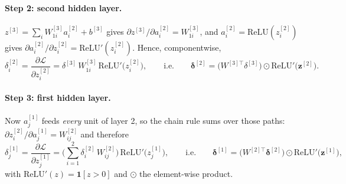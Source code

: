 \documentclass[11pt,a4paper]{article}
\begin{document}
\paragraph{Step 2: second hidden layer.} $z^{[3]}=\sum_{i}W^{[3]}_{1i}a^{[2]}_i+b^{[3]}$
gives $\partial z^{[3]}/\partial a^{[2]}_i=W^{[3]}_{1i}$, and $a^{[2]}_i=\mathrm{ReLU}(z^{[2]}_i)$
gives $\partial a^{[2]}_i/\partial z^{[2]}_i=\mathrm{ReLU}'(z^{[2]}_i)$. Hence, componentwise,
\begin{equation}
\delta^{[2]}_i=\frac{\partial\mathcal{L}}{\partial z^{[2]}_i}
=\delta^{[3]}\,W^{[3]}_{1i}\,\mathrm{ReLU}'\!\big(z^{[2]}_i\big),
\qquad\text{i.e.}\qquad
\boldsymbol{\delta}^{[2]} = \big(W^{[3]\top}\delta^{[3]}\big)\odot
      \mathrm{ReLU}'\!\big(\mathbf{z}^{[2]}\big).
\end{equation}

\paragraph{Step 3: first hidden layer.} Now $a^{[1]}_j$ feeds \emph{every} unit of layer 2,
so the chain rule sums over those paths: $\partial z^{[2]}_i/\partial a^{[1]}_j=W^{[2]}_{ij}$
and therefore
\begin{equation}
\delta^{[1]}_j=\frac{\partial\mathcal{L}}{\partial z^{[1]}_j}
=\Big(\sum_{i=1}^{2}\delta^{[2]}_i\,W^{[2]}_{ij}\Big)\,\mathrm{ReLU}'\!\big(z^{[1]}_j\big),
\qquad\text{i.e.}\qquad
\boldsymbol{\delta}^{[1]} = \big(W^{[2]\top}\boldsymbol{\delta}^{[2]}\big)\odot
      \mathrm{ReLU}'\!\big(\mathbf{z}^{[1]}\big),
\end{equation}
with $\mathrm{ReLU}'(z)=\mathbf{1}[z>0]$ and $\odot$ the element-wise product.
\end{document}
